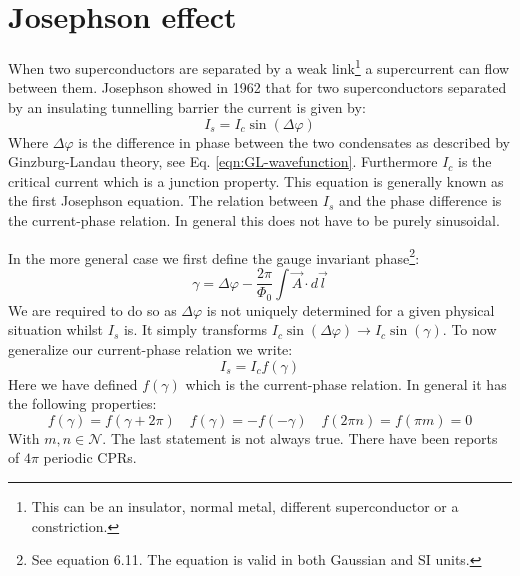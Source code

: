 \section{Josephson effect}
\label{sec:josephson-effect}
When two superconductors are separated by a weak link\footnote{This can be an insulator, normal metal, different superconductor or a constriction.} a supercurrent can flow between them. Josephson showed in 1962 that for two superconductors separated by an insulating tunnelling barrier the current is given by\cite{tinkhamIntroductionSuperconductivity}:
\begin{equation}
	I_s = I_c \sin(\Delta \varphi)
\end{equation}
Where $\Delta \varphi$ is the difference in phase between the two condensates as described by Ginzburg-Landau theory, see Eq. \ref{eqn:GL-wavefunction}. Furthermore $I_c$ is the critical current which is a junction property. This equation is generally known as the first Josephson equation. The relation between $I_s$ and the phase difference is the current-phase relation. In general this does not have to be purely sinusoidal\cite{golubovCurrentphaseRelationJosephson2004a}.

In the more general case we first define the gauge invariant phase\footnote{See  equation 6.11. The equation is valid in both Gaussian and SI units.}:
\begin{equation}
	\gamma = \Delta \varphi - \frac{2\pi}{\Phi_0}\int \vec{A} \cdot d\vec{l}
	\label{eqn:gauge-invariant-phase}
\end{equation}
We are required to do so as $\Delta \varphi$ is not uniquely determined for a given physical situation whilst $I_s$ is\cite{tinkhamIntroductionSuperconductivity}. It simply transforms $I_c \sin(\Delta \varphi) \to I_c \sin(\gamma)$. To now generalize our current-phase relation we write:
\begin{equation}
	I_s = I_c f(\gamma)
\end{equation}
Here we have defined $f(\gamma)$ which is the current-phase relation. In general it has the following properties\cite{golubovCurrentphaseRelationJosephson2004a}:
\begin{equation}
	f(\gamma) = f(\gamma + 2\pi) \quad f(\gamma) = -f(-\gamma) \quad f(2\pi n) = f(\pi m) = 0
\end{equation}
With $m,n \in \mathcal{N}$. The last statement is not always true. There have been reports of $4\pi$ periodic CPRs\cite{endresCurrentPhaseRelation2023}.


